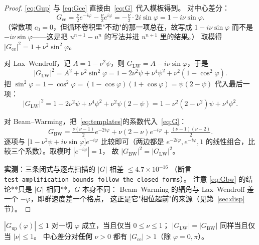 \begin{proof}
\eqref{eq:Gup} 与 \eqref{eq:Gce} 直接由~\eqref{eq:G}~代入模板得到。
对中心差分：
\begin{equation}
  G_{\text{ce}}=\tfrac{\nu}{2}e^{-i\varphi}-\tfrac{\nu}{2}e^{i\varphi}=-\tfrac{\nu}{2}\cdot 2i\sin\varphi=1-i\nu\sin\varphi .
\end{equation}
（常数项 $c_0=0$，但循环卷积里"不动"的那一项总在，故写成 $1-i\nu\sin\varphi$
而不是 $-i\nu\sin\varphi$——这是把 $u^{n+1}-u^n$ 的写法并进 $u^{n+1}$ 里的结果。）
取模得 $|G_{\text{ce}}|^2=1+\nu^2\sin^2\varphi$。

对 Lax--Wendroff，记 $A=1-\nu^2\psi$，则 $G_{\text{LW}}=A-i\nu\sin\varphi$，于是
\begin{equation}
  |G_{\text{LW}}|^2=A^2+\nu^2\sin^2\varphi
  =1-2\nu^2\psi+\nu^4\psi^2+\nu^2(1-\cos^2\varphi).
\end{equation}
把 $\sin^2\varphi=1-\cos^2\varphi=(1-\cos\varphi)(1+\cos\varphi)=\psi(2-\psi)$ 代入最后一项：
\begin{equation}
  |G_{\text{LW}}|^2=1-2\nu^2\psi+\nu^4\psi^2+\nu^2\psi(2-\psi)
  =1-\nu^2(2-\nu^2)\psi+\nu^4\psi^2 .
\end{equation}

对 Beam--Warming，把~\eqref{eq:templates}的系数代入~\eqref{eq:G}：
\begin{equation}
  G_{\text{BW}}=\tfrac{\nu(\nu-1)}{2}e^{-2i\varphi}+\nu(2-\nu)e^{-i\varphi}
  +\tfrac{(\nu-1)(\nu-2)}{2}.
\end{equation}
逐项与 $\bigl[1-\nu^2\psi+i\nu\sin\varphi\bigr]e^{-i\varphi}$ 比较即可（两边都是
$e^{-2i\varphi},e^{-i\varphi},1$ 的线性组合，比较三个系数）。取模时 $|e^{-i\varphi}|=1$，
故 $|G_{\text{BW}}|^2=|G_{\text{LW}}|^2$。

\textbf{实测}：三条闭式与逐点扫描的 $|G|$ 相差 $\le4.7\times10^{-16}$
（断言 \texttt{test\_amplification\_bounds\_follow\_the\_closed\_forms}）。
注意 \eqref{eq:Gbw} 的结论**只是 $|G|$ 相同**，$G$ 本身不同：
Beam--Warming 的辐角与 Lax--Wendroff 差一个 $-\varphi$，即群速度差一个格点，
这正是它"相位超前"的来源（见第~\ref{sec:disp}节）。
\end{proof}

\begin{theorem}[稳定判据]
\label{thm:stable}
$|G_{\text{up}}(\varphi)|\le1$ 对一切 $\varphi$ 成立，当且仅当 $0\le\nu\le1$；
$|G_{\text{LW}}|=|G_{\text{BW}}|$ 同样当且仅当 $|\nu|\le1$。
中心差分对\textbf{任何} $\nu>0$ 都有 $|G_{\text{ce}}|>1$（除 $\varphi=0,\pi$）。
\end{theorem}

